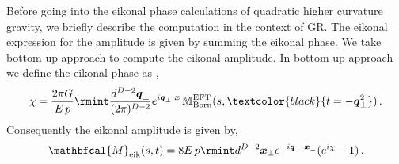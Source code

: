Before going into the eikonal phase calculations of quadratic higher curvature gravity, we briefly describe the computation in the context of GR. The eikonal expression for the amplitude is given by summing the eikonal phase. We take bottom-up approach to compute the eikonal amplitude. In bottom-up approach we define the eikonal phase as \cite{Kabat:1992tb,PhysRev.186.1656, DiVecchia:2023frv},
\begin{align}
    \chi=\frac{2\pi G}{E\,p}\rmint \frac{d^{D-2}\boldsymbol{q}_{\perp}}{(2\pi)^{D-2}}  e^{i \boldsymbol{q}_{\perp}\cdot \boldsymbol{x}}\,\mathbb{M}^{\textrm{EFT}}_{\textrm{Born}}(s,\textcolor{black}{t=- \boldsymbol{q}_{\perp}^2})\,.
\end{align}
Consequently the eikonal amplitude is given by,
\begin{align}
    \begin{split}
    \mathbfcal{M}_{\textrm{eik}}(s,t)=8E\,p\rmint d^{D-2}\boldsymbol{x}_{\perp} e^{-i\boldsymbol{q}_{\perp}\cdot \boldsymbol{x}_{\perp} }(e^{i\chi}-1)\,.
    \end{split}
\end{align}
\noindent
